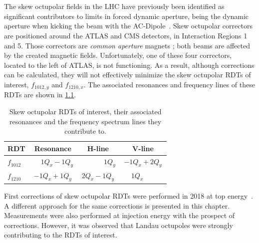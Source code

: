 \chapter{}
\label{chapter:skew_octupole_fields}
\thumbforchapter{}
\chaptertoc{}


\section{}

The skew octupolar fields in the LHC have previously been identified as significant contributors to 
limits in forced dynamic aperture, being the dynamic aperture when kicking the beam with the
AC-Dipole~\cite{carlier_nonlinear_2020}. Skew octupolar correctors are positioned around the
ATLAS and CMS detectors, in Interaction Regions 1 and 5. Those correctors are \textit{common
aperture} magnets ; both beams are affected by the created magnetic fields. Unfortunately, one of
these four correctors, located to the left of ATLAS, is not functioning. As a result, although
corrections can be calculated, they will not effectively minimize the skew octupolar RDTs of
interest, $f_{1012,y}$ and $f_{1210,x}$. 
The associated resonances and frequency lines of these RDTs are shown in
\cref{tab:skew_octupolar:resonances_rdts}.

\begin{table}[!htb]
    \centering
    \begin{tabular}{lccc}
      \toprule
      RDT         & Resonance                &  H-line                    & V-line         \\
      \midrule
      $f_{1012}$  & $\phantom{-}1Q_x - 1Q_y$ &  $\phantom{2Q_x-\ \,}1Q_y$ & $-1Q_x + 2Q_y$ \\
      $f_{1210}$  & $-1Q_x + 1Q_y$           &  $2Q_x - 1Q_y$             & $\phantom{-}1Q_x\phantom{+2Q_y\ \,}$    \\
      \bottomrule
    \end{tabular}
    \caption{Skew octupolar RDTs of interest, their associated resonances and the frequency spectrum
    lines they contribute to.}
    \label{tab:skew_octupolar:resonances_rdts}
\end{table}

First corrections of skew octupolar RDTs were performed in 2018 at top
energy~\cite{carlier_nonlinear_2020}. A different approach for the same corrections is presented in
this chapter.
Measurements were also performed at injection energy with the prospect of corrections. However, it
was observed that Landau octupoles were strongly contributing to the RDTs of interest.


